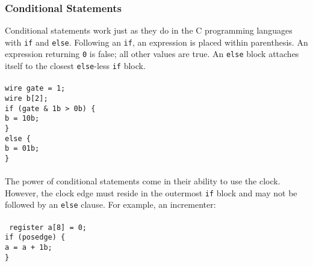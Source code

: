 \documentclass[letterpaper,11pt]{article}
\newcommand{\tab}{\hspace*{2em}}
\begin{document}
        \subsubsection{Conditional Statements}
        Conditional statements work just as they do in the C programming languages with \texttt{if} and \texttt{else}. 
        Following an \texttt{if}, an expression is placed within parenthesis.  An expression returning \texttt{0} is false; all other values are true.  An \texttt{else} 
        block attaches itself to the closest \texttt{else}-less \texttt{if} block.\\\\
        \texttt{wire gate = 1; \\
        wire b[2]; \\
        if (gate \& 1b > 0b) \{ \\
        \tab b = 10b; \\
        \} \\
        else \{ \\
        \tab b = 01b; \\
        \}}\\\\
        The power of conditional statements come in their ability to use the clock.  However, the clock edge must reside in the outermost \texttt{if} block and may not be followed by an \texttt{else} clause. For example, an incrementer:\\\\
        \texttt{
        register a[8] = 0; \\
        if (posedge) \{ \\
        \tab a = a + 1b;\\
        \}}\\
\end{document}
